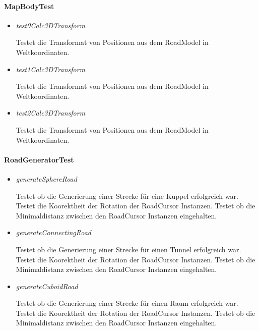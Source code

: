 \paragraph{MapBodyTest}
\begin{itemize}
    \item \textit{test0Calc3DTransform}
        \begin{leftbar}[0.9\linewidth]
			Testet die Transformat von Positionen aus dem RoadModel
			in Weltkoordinaten.
		\end{leftbar}
	\item \textit{test1Calc3DTransform}
        \begin{leftbar}[0.9\linewidth]
            Testet die Transformat von Positionen aus dem RoadModel
			in Weltkoordinaten.
		\end{leftbar}
	\item \textit{test2Calc3DTransform}
        \begin{leftbar}[0.9\linewidth]
            Testet die Transformat von Positionen aus dem RoadModel
			in Weltkoordinaten.
		\end{leftbar}
\end{itemize}

\paragraph{RoadGeneratorTest}
\begin{itemize}
	\item \textit{generateSphereRoad}
        \begin{leftbar}[0.9\linewidth]
			Testet ob die Generierung einer Strecke für eine Kuppel erfolgreich war.
			Testet die Koorektheit der Rotation der RoadCursor Instanzen.
			Testet ob die Minimaldistanz zwischen den RoadCursor Instanzen eingehalten.
		\end{leftbar}
	\item \textit{generateConnectingRoad}
        \begin{leftbar}[0.9\linewidth]
            Testet ob die Generierung einer Strecke für einen Tunnel erfolgreich war.
			Testet die Koorektheit der Rotation der RoadCursor Instanzen.
			Testet ob die Minimaldistanz zwischen den RoadCursor Instanzen eingehalten.
		\end{leftbar}
	\item \textit{generateCuboidRoad}
        \begin{leftbar}[0.9\linewidth]
            Testet ob die Generierung einer Strecke für einen Raum erfolgreich war.
			Testet die Koorektheit der Rotation der RoadCursor Instanzen.
			Testet ob die Minimaldistanz zwischen den RoadCursor Instanzen eingehalten.
		\end{leftbar}
\end{itemize}

